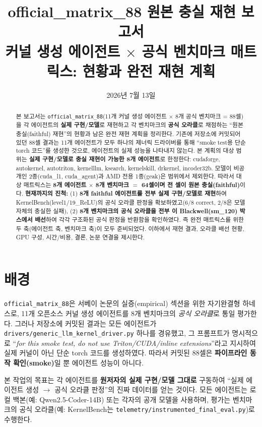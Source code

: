 \documentclass[11pt]{article}
\title{\textbf{official\_matrix\_88 원본 충실 재현 보고서}\\[2pt]
\large 커널 생성 에이전트 $\times$ 공식 벤치마크 매트릭스: 현황과 완전 재현 계획}
\author{}
\date{2026년 7월 13일}
\newcommand{\code}[1]{\texttt{\small #1}}
\begin{document}
\maketitle

\begin{abstract}
\noindent
본 보고서는 \code{official\_matrix\_88}(11개 커널 생성 에이전트 $\times$ 8개 공식 벤치마크 = 88셀)을
각 에이전트의 \textbf{실제 구현/모델}로 재현하고 각 벤치마크의 \textbf{공식 오라클}로 채점하는
``원본 충실(faithful) 재현''의 현황과 남은 완전 재현 계획을 정리한다.
기존에 저장소에 커밋되어 있던 88셀 결과는 11개 에이전트가 모두 하나의 제너릭 드라이버를 통해
``smoke test용 단순 torch 코드''를 생성한 것으로, 에이전트의 실제 성능을 나타내지 않는다.
본 계획의 대상 범위는 \textbf{실제 구현/모델로 충실 재현이 가능한 8개 에이전트}로 한정한다:
cudaforge, autokernel, autotriton, kernelllm, ksearch, kernelskill, drkernel, incoder32b.
모델이 비공개인 2종(cuda\_l1, cuda\_agent)과 AMD 전용 1종(geak)은 범위에서 제외한다.
따라서 대상 매트릭스는 \textbf{8개 에이전트 $\times$ 8개 벤치마크 $=$ 64셀이며 전 셀이 원본 충실(faithful)}이다.
\textbf{현재까지의 진척:} (1) \textbf{8개 faithful 에이전트를 전부 실제 구현/모델로 재현}하여
KernelBench(level1/19\_ReLU)의 공식 오라클 판정을 확보하였고(6/8 correct, 2/8은 모델 자체의
충실한 실패), (2) \textbf{8개 벤치마크의 공식 오라클을 전부 이 Blackwell(sm\_120) 박스에서 배선}하여
각각 구조화된 공식 판정을 반환함을 확인하였다. 즉 완전 매트릭스를 위한 두 축(에이전트 축, 벤치마크 축)이
모두 준비되었다. 이하에서 재현 결과, 오라클 배선 현황, GPU 구성, 시간/비용, 결론, 논문 연결을 제시한다.
\end{abstract}

\section{배경}
\code{official\_matrix\_88}은 서베이 논문의 실증(empirical) 섹션을 위한 자기완결형 하네스로,
11개 오픈소스 커널 생성 에이전트를 8개 벤치마크의 \emph{공식 오라클}로 통일 평가한다.
그러나 저장소에 커밋된 결과는 모든 에이전트가 \code{drivers/generic\_llm\_kernel\_driver.py}
하나를 경유했고, 그 프롬프트가 명시적으로
``\emph{for this smoke test, do not use Triton/CUDA/inline extensions}''라고 지시하여
실제 커널이 아닌 단순 torch 코드를 생성하였다. 따라서 커밋된 88셀은
\textbf{파이프라인 동작 확인(smoke)}일 뿐 에이전트 성능이 아니다.

본 작업의 목표는 각 에이전트를 \textbf{원저자의 실제 구현/모델 그대로} 구동하여
``실제 에이전트 생성 $\rightarrow$ 공식 오라클 판정''의 진짜 데이터를 얻는 것이다.
모든 에이전트는 로컬 백본(예: Qwen2.5-Coder-14B) 또는 각자의 공개 모델을 사용하며,
평가는 벤치마크의 공식 오라클(예: KernelBench는 \code{telemetry/instrumented\_final\_eval.py})로 수행한다.
\end{document}
